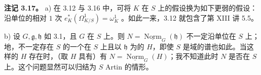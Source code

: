 \textbf{注记 3.17。} a) 在 3.12 与 3.16 中，可将 $K$ 在 $S$ 上的假设换为如下更弱的假设：沿单位的相对 $1$ 次 $e_K^*(\Omega^1_{K/S})=\omega_K^1$ 。如此一来，3.12 就包含了第 XIII 讲 5.5。

b) 设 $G,\mathfrak g,\mathfrak h$ 如 3.1，且 $G$ 在 $S$ 上。则 $N=\underline{\operatorname{Norm}}_G(\mathfrak h)$ 不一定沿单位在 $S$ 上；地，不一定存在 $S$ 的一个在 $S$ 上且以 $\mathfrak h$ 为的 $H$，即使 $S$ 是域的谱也如此。当这样的 $H$ 存在时，（取 $H$ 具有）有 $N=\underline{\operatorname{Norm}}_G(H)$；我不知道此时 $N$ 是否在 $S$ 上。这个问题显然可以归结为 $S$ Artin 的情形。

